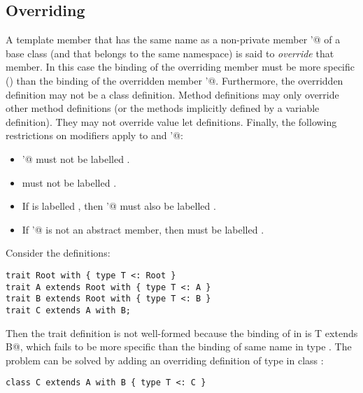 \documentclass[11pt]{report}
\newcommand{\ifqualified}[1]{}
\begin{document}
\ifqualified{
\example\label{ex:compound-b}
Consider the definitions:
\begin{verbatim}
qualified class Root extends Any with { def r1: Root, r2: Int }
qualified class A extends Root with { def r1: A, a: String }
qualified class B extends A with { def r1: B, b: Double }
\end{verbatim}
Then \verb@A with B@ has members
\verb@Root::r1@ of type \verb@B@, \verb@Root::r2@ of type \verb@Int@,
\verb@A::a:@ of type \verb@String@, and \verb@B::b@ of type \verb@Double@,
in addition to the members inherited from class \verb@Any@.
}

\subsection{Overriding}
\label{sec:overriding}

A template member \verb@M@ that has the same \ifqualified{qualified}
name as a non-private member \verb@M'@ of a base class (and that
belongs to the same namespace) is said to {\em override} that member.
In this case the binding of the overriding member \verb@M@ must be
more specific () than the binding of the
overridden member \verb@M'@.  Furthermore, the overridden definition
may not be a class definition.  Method definitions may only override
other method definitions (or the methods implicitly defined by a
variable definition). They may not override value let definitions.
Finally, the following restrictions on modifiers apply to \verb@M@ and
\verb@M'@:
\begin{itemize}
\item
\verb@M'@ must not be labelled \verb@final@.
\item
\verb@M@ must not be labelled \verb@private@.
\item
If \verb@M@ is labelled \verb@protected@, then \verb@M'@ must also be
labelled \verb@protected@.
\item
If \verb@M'@ is not an abstract member, then
\verb@M@ must be labelled \verb@override@.
\end{itemize}

\example\label{ex:compound-a}
Consider the definitions:
\begin{verbatim}
trait Root with { type T <: Root }
trait A extends Root with { type T <: A }
trait B extends Root with { type T <: B }
trait C extends A with B;
\end{verbatim}
Then the trait definition \verb@C@ is not well-formed because the
binding of \verb@T@ in \verb@C@ is
\verb@type T extends B@,
which fails to be more specific than the binding of same name in type
\verb@A@. The problem can be solved by adding an overriding 
definition of type \verb@T@ in class \verb@C@:
\begin{verbatim}
class C extends A with B { type T <: C }
\end{verbatim}
\end{document}
